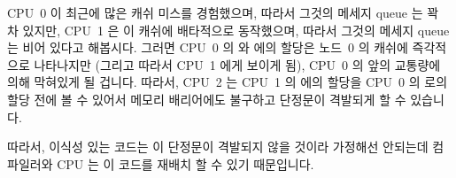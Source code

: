 CPU~0 이 최근에 많은 캐쉬 미스를 경험했으며, 따라서 그것의 메세지 queue 는 꽉
차 있지만, CPU~1 은 이 캐쉬에 배타적으로 동작했으며, 따라서 그것의 메세지 queue
는 비어 있다고 해봅시다.
그러면 CPU~0 의  와  에의 할당은 노드~0 의 캐쉬에 즉각적으로
나타나지만 (그리고 따라서 CPU~1 에게 보이게 됨), CPU~0 의 앞의 교통량에 의해
막혀있게 될 겁니다.
따라서, CPU~2 는 CPU~1 의  에의 할당을 CPU~0 의  로의 할당 전에
볼 수 있어서 메모리 배리어에도 불구하고 단정문이 격발되게 할 수 있습니다.

따라서, 이식성 있는 코드는 이 단정문이 격발되지 않을 것이라 가정해선 안되는데
컴파일러와 CPU 는 이 코드를 재배치 할 수 있기 때문입니다.

\iffalse

Suppose CPU~0 recently experienced many cache misses, so that its
message queue is full, but that CPU~1 has been running exclusively within
the cache, so that its message queue is empty.
Then CPU~0's assignment to \qco{a} and \qco{b} will appear in Node~0's cache
immediately (and thus be visible to CPU~1), but will be blocked behind
CPU~0's prior traffic.
In contrast, CPU~1's assignment to \qco{c} will sail through CPU~1's
previously empty queue.
Therefore, CPU~2 might well see CPU~1's assignment to \qco{c} before
it sees CPU~0's assignment to \qco{a}, causing the assertion to fire,
despite the memory barriers.

Therefore, portable code cannot rely on this assertion not firing,
as both the compiler and the CPU can reorder the code so as to trip
the assertion.

\fi

